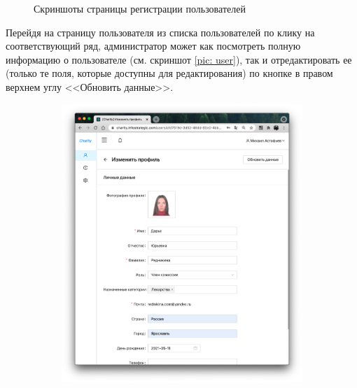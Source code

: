 \documentclass[a4paper,12pt,reqno]{article}
\begin{document}
\begin{figure}[H]
\begin{subfigure}[b]{0.475\linewidth}
		\end{subfigure}
		\caption{Скриншоты страницы регистрации пользователей}
		\label{pic: users}
	\end{figure}
	
	Перейдя на страницу пользователя из списка пользователей по клику на соответствующий ряд, администратор может как посмотреть полную информацию о пользователе (см. скриншот \ref{pic: user}), так и отредактировать ее (только те поля, которые доступны для редактирования) по кнопке в правом верхнем углу <<Обновить данные>>. 
	
	\begin{figure}[H]
		\centering
		\begin{subfigure}[b]{0.475\linewidth}
			\includegraphics[width=\linewidth]{img/ro/user_upd.png}
		\end{subfigure}
		\begin{subfigure}[b]{0.475\linewidth}

\end{subfigure}
\end{figure}
\end{document}
